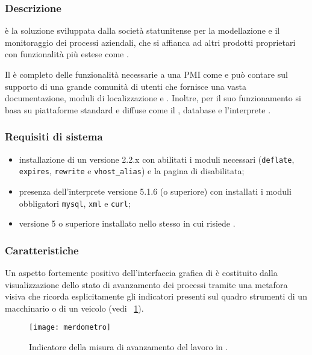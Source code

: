 \subsubsection{Descrizione}
\progname è la soluzione  sviluppata dalla società statunitense  per la modellazione e il monitoraggio dei processi aziendali, che si affianca ad altri prodotti proprietari con funzionalità più estese come .

Il \sw è completo delle funzionalità necessarie a una PMI come \customer e può contare sul supporto di una grande comunità di utenti che fornisce una vasta documentazione, moduli di localizzazione e . Inoltre, per il suo funzionamento si basa su piattaforme standard e diffuse come il  , database  e l'interprete .

\subsubsection{Requisiti di sistema}	
\begin{itemize}
	\item installazione di un   versione 2.2.x con abilitati i moduli necessari (\texttt{deflate}, \texttt{expires}, \texttt{rewrite} e \texttt{vhost\_alias}) e la pagina di  disabilitata;
	\item presenza dell'interprete  versione 5.1.6  (o superiore) con installati i moduli obbligatori \texttt{mysql}, \texttt{xml} e \texttt{curl};
	\item {}  versione 5 o superiore installato nello stesso  in cui risiede \progname.
\end{itemize}


\subsubsection{Caratteristiche}
Un aspetto fortemente positivo dell'interfaccia grafica di \progname è costituito dalla visualizzazione dello stato di avanzamento dei processi tramite una metafora visiva che ricorda esplicitamente gli indicatori presenti sul quadro strumenti di un macchinario o di un veicolo (vedi \figurename~\ref{fig:merdometro}).

\begin{figure}[H]
  \centering
  \texttt{[image: merdometro]}
  \caption{Indicatore della misura di avanzamento del lavoro in \progname.}
  \label{fig:merdometro}
\end{figure}

